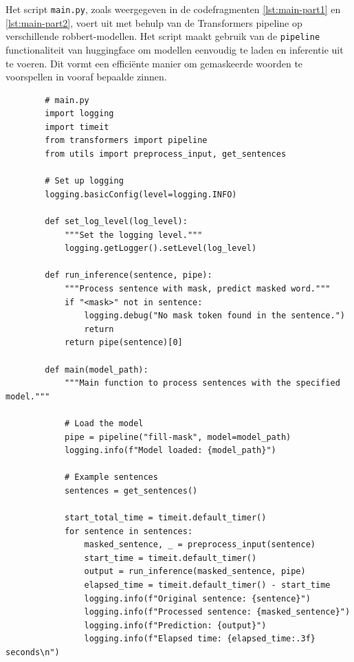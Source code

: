 Het script \texttt{main.py}, zoals weergegeven in de codefragmenten \ref{lst:main-part1} en \ref{lst:main-part2}, voert  uit met behulp van de Transformers pipeline op verschillende \gls{robbert}-modellen. Het script maakt gebruik van de \texttt{pipeline} functionaliteit van \gls{huggingface} om modellen eenvoudig te laden en inferentie uit te voeren. Dit vormt een efficiënte manier om gemaskeerde woorden te voorspellen in vooraf bepaalde zinnen.

\begin{listing}
    \begin{verbatim}
        # main.py
        import logging
        import timeit
        from transformers import pipeline
        from utils import preprocess_input, get_sentences
        
        # Set up logging
        logging.basicConfig(level=logging.INFO)
        
        def set_log_level(log_level):
            """Set the logging level."""
            logging.getLogger().setLevel(log_level)
        
        def run_inference(sentence, pipe):
            """Process sentence with mask, predict masked word."""
            if "<mask>" not in sentence:
                logging.debug("No mask token found in the sentence.")
                return
            return pipe(sentence)[0]
            
        def main(model_path):
            """Main function to process sentences with the specified model."""
            
            # Load the model
            pipe = pipeline("fill-mask", model=model_path)
            logging.info(f"Model loaded: {model_path}")
            
            # Example sentences
            sentences = get_sentences()
            
            start_total_time = timeit.default_timer()
            for sentence in sentences:
                masked_sentence, _ = preprocess_input(sentence)
                start_time = timeit.default_timer()
                output = run_inference(masked_sentence, pipe)
                elapsed_time = timeit.default_timer() - start_time
                logging.info(f"Original sentence: {sentence}")
                logging.info(f"Processed sentence: {masked_sentence}")
                logging.info(f"Prediction: {output}")
                logging.info(f"Elapsed time: {elapsed_time:.3f} seconds\n")
            

\end{verbatim}
\end{listing}
